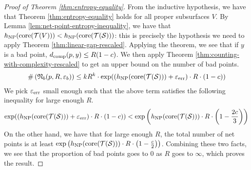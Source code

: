\documentclass[12pt, reqno]{amsart}
\begin{document}
\begin{proof}[Proof of Theorem \ref{thm:entropy-equality}]
  From the inductive hypothesis, we have that Theorem \ref{thm:entropy-equality} holds for all proper subsurfaces $V$.
  By Lemma \ref{lem:net-point-entropy-inequality}, we have that $h_{\mathrm{NP}}(\mathrm{core}(\mathcal{T}(V))) < h_{\mathrm{NP}}(\mathrm{core}(\mathcal{T}(\mathcal{S})))$: this is precisely the hypothesis we need to apply Theorem \ref{thm:linear-gap-rescaled}.
  Applying the theorem, we see that if $y$ is a bad point, $d_{\mathrm{comp}}(p, y) \leq R(1 - c)$.
  We then apply Theorem \ref{thm:counting-with-complexity-rescaled} to get an upper bound on the number of bad points.
  \begin{align*}
    \#\left( \mathfrak{N}_b(p, R, \varepsilon_b) \right) \leq kR^k \cdot \exp((h_{\mathrm{NP}}(\mathrm{core}(\mathcal{T}(\mathcal{S}))) + \varepsilon_{\mathrm{err}}) \cdot R \cdot (1 - c))
  \end{align*}
  We pick $\varepsilon_{\mathrm{err}}$ small enough such that the above term satisfies the following inequality for large enough $R$.
  \begin{align*}
    \exp((h_{\mathrm{NP}}(\mathrm{core}(\mathcal{T}(\mathcal{S}))) + \varepsilon_{\mathrm{err}}) \cdot R \cdot (1 - c)) < \exp\left(h_{\mathrm{NP}}(\mathrm{core}(\mathcal{T}(\mathcal{S}))) \cdot R \cdot \left(1 - \frac{2c}{3}\right)\right)
  \end{align*}
  On the other hand, we have that for large enough $R$, the total number of net points is at least $\exp\left(h_{\mathrm{NP}}(\mathrm{core}(\mathcal{T}(\mathcal{S}))) \cdot R \cdot \left(1 - \frac{c}{2}\right)\right)$.
  Combining these two facts, we see that the proportion of bad points goes to $0$ as $R$ goes to $\infty$, which proves the result.
\end{proof}


\end{document}
